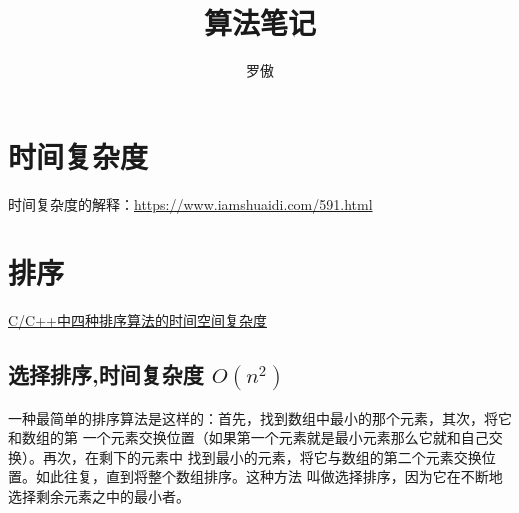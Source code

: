 \documentclass[12pt,a4paper,onecolumn]{article}
\author{罗傲}
\title{算法笔记}
\begin{document}
	\maketitle
	\section{时间复杂度}
	时间复杂度的解释：\hyperref{https://www.iamshuaidi.com/591.html}{category}{name}{https://www.iamshuaidi.com/591.html}
	\section{排序}
	\hyperref{https://blog.csdn.net/struggle_kid/article/details/107933623}{category}{name}{C/C++中四种排序算法的时间空间复杂度}
	\subsection{选择排序,时间复杂度 $O(n^2)$}
	一种最简单的排序算法是这样的：首先，找到数组中最小的那个元素，其次，将它和数组的第
	一个元素交换位置（如果第一个元素就是最小元素那么它就和自己交换）。再次，在剩下的元素中
	找到最小的元素，将它与数组的第二个元素交换位置。如此往复，直到将整个数组排序。这种方法
	叫做选择排序，因为它在不断地选择剩余元素之中的最小者。
\end{document}
